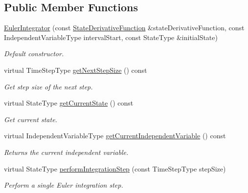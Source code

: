 \subsection*{Public Member Functions}
\begin{DoxyCompactItemize}
\item 
\hyperlink{classtudat_1_1numerical__integrators_1_1EulerIntegrator_a35afaa235cbe71bd2ce8d26e25caeaae}{Euler\+Integrator} (const \hyperlink{classtudat_1_1numerical__integrators_1_1EulerIntegrator_a868c812e8c32d247e52ca0800c6db198}{State\+Derivative\+Function} \&state\+Derivative\+Function, const Independent\+Variable\+Type interval\+Start, const State\+Type \&initial\+State)
\begin{DoxyCompactList}\small\item\em Default constructor. \end{DoxyCompactList}\item 
virtual Time\+Step\+Type \hyperlink{classtudat_1_1numerical__integrators_1_1EulerIntegrator_afed70bf6b0e3c7dcc859efa88f244fc9}{get\+Next\+Step\+Size} () const 
\begin{DoxyCompactList}\small\item\em Get step size of the next step. \end{DoxyCompactList}\item 
virtual State\+Type \hyperlink{classtudat_1_1numerical__integrators_1_1EulerIntegrator_ac7581da0b3b719d3fa178cb275109cb2}{get\+Current\+State} () const 
\begin{DoxyCompactList}\small\item\em Get current state. \end{DoxyCompactList}\item 
virtual Independent\+Variable\+Type \hyperlink{classtudat_1_1numerical__integrators_1_1EulerIntegrator_a8f4705c257d7fe1a58b62717c0abe971}{get\+Current\+Independent\+Variable} () const 
\begin{DoxyCompactList}\small\item\em Returns the current independent variable. \end{DoxyCompactList}\item 
virtual State\+Type \hyperlink{classtudat_1_1numerical__integrators_1_1EulerIntegrator_a6ff2ab6fbde6cb97cfe77961963e4910}{perform\+Integration\+Step} (const Time\+Step\+Type step\+Size)
\begin{DoxyCompactList}\small\item\em Perform a single Euler integration step. \end{DoxyCompactList}\item 

\end{DoxyCompactItemize}
